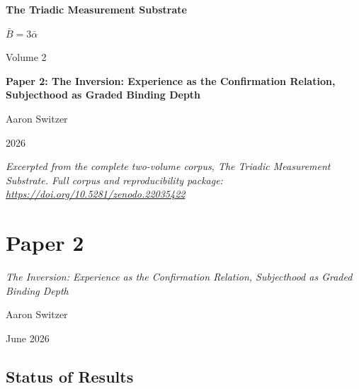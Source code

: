\documentclass[11pt,oneside]{report}
\theoremstyle{definition}
\theoremstyle{remark}
\begin{document}
\thispagestyle{empty}
\begin{titlepage}
\centering
\vspace*{2cm}
{\sffamily\bfseries\Large The Triadic Measurement Substrate\par}
\vspace{0.6cm}
{\large $\bar{B} = 3\bar{\alpha}$\par}
\vspace{1cm}
{\sffamily\large Volume 2\par}
\vspace{1.4cm}
{\Large \bfseries Paper 2: The Inversion: Experience as the Confirmation Relation, Subjecthood as Graded Binding Depth\par}
\vfill
{\large Aaron Switzer\par}
\vspace{0.4cm}
{\large 2026\par}
\vspace{1.2cm}
{\small\itshape Excerpted from the complete two-volume corpus, \emph{The Triadic Measurement Substrate}. Full corpus and reproducibility package: \url{https://doi.org/10.5281/zenodo.22035422}\par}
\end{titlepage}
\cleardoublepage
{}

\chapter*{Paper 2}
\begingroup\centering
{\large\itshape The Inversion: Experience as the Confirmation Relation, Subjecthood as Graded Binding Depth\par}\vspace{0.8em}
{\normalsize Aaron Switzer\par}
{\small June 2026\par}
\endgroup\vspace{1.0em}

\par\vspace{0.6em}

\section*{Status of Results}
\end{document}
